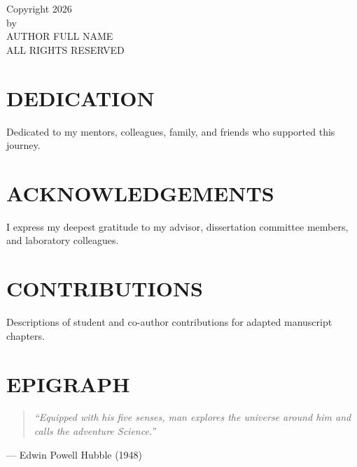 \documentclass[12pt,oneside]{report}
\begin{document}

\setcounter{page}{2} %

\thispagestyle{fancy}
\begin{center}
  \vspace*{2.5in}
  Copyright 2026\\[0.2in]
  by\\[0.2in]
  AUTHOR FULL NAME\\[0.2in]
  ALL RIGHTS RESERVED
\end{center}
\clearpage

\chapter*{DEDICATION}
\doublespacing
Dedicated to my mentors, colleagues, family, and friends who supported this journey.
\clearpage

\chapter*{ACKNOWLEDGEMENTS}
\doublespacing
I express my deepest gratitude to my advisor, dissertation committee members, and laboratory colleagues.
\clearpage

\chapter*{CONTRIBUTIONS}
\doublespacing
Descriptions of student and co-author contributions for adapted manuscript chapters.
\clearpage

\chapter*{EPIGRAPH}
\doublespacing
\vspace*{1.5in}
\begin{quotation}
  \itshape
  ``Equipped with his five senses, man explores the universe around him and calls the adventure Science.''
\end{quotation}
\begin{flushright}
  --- Edwin Powell Hubble (1948)
\end{flushright}
\clearpage
\end{document}
